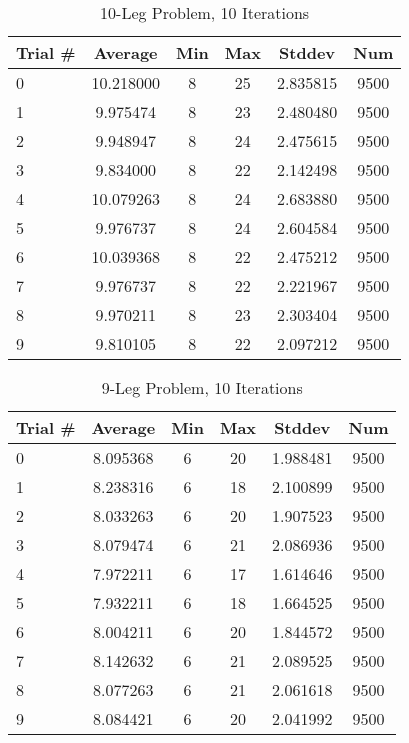 \documentclass{article}
\begin{document}
\begin{table}
\centering
\begin{tabular}{|l|c|c|c|c|c|}
\hline
Trial \# & Average & Min & Max & Stddev & Num \\
\hline
0 & 10.218000 & 8 & 25 & 2.835815 & 9500 \\ 
1 & 9.975474 & 8 & 23 & 2.480480 & 9500 \\ 
2 & 9.948947 & 8 & 24 & 2.475615 & 9500 \\ 
3 & 9.834000 & 8 & 22 & 2.142498 & 9500 \\ 
4 & 10.079263 & 8 & 24 & 2.683880 & 9500 \\ 
5 & 9.976737 & 8 & 24 & 2.604584 & 9500 \\ 
6 & 10.039368 & 8 & 22 & 2.475212 & 9500 \\ 
7 & 9.976737 & 8 & 22 & 2.221967 & 9500 \\ 
8 & 9.970211 & 8 & 23 & 2.303404 & 9500 \\ 
9 & 9.810105 & 8 & 22 & 2.097212 & 9500 \\ 
\hline
\end{tabular}
\caption{10-Leg Problem, 10 Iterations}
\label{tab:template}
\end{table}

\begin{table}
\centering
\begin{tabular}{|l|c|c|c|c|c|}
\hline
Trial \# & Average & Min & Max & Stddev & Num \\
\hline
0 & 8.095368 & 6 & 20 & 1.988481 & 9500 \\ 
1 & 8.238316 & 6 & 18 & 2.100899 & 9500 \\ 
2 & 8.033263 & 6 & 20 & 1.907523 & 9500 \\ 
3 & 8.079474 & 6 & 21 & 2.086936 & 9500 \\ 
4 & 7.972211 & 6 & 17 & 1.614646 & 9500 \\ 
5 & 7.932211 & 6 & 18 & 1.664525 & 9500 \\ 
6 & 8.004211 & 6 & 20 & 1.844572 & 9500 \\ 
7 & 8.142632 & 6 & 21 & 2.089525 & 9500 \\ 
8 & 8.077263 & 6 & 21 & 2.061618 & 9500 \\ 
9 & 8.084421 & 6 & 20 & 2.041992 & 9500 \\ 
\hline
\end{tabular}
\caption{9-Leg Problem, 10 Iterations}
\label{tab:template}
\end{table}
\end{document}
